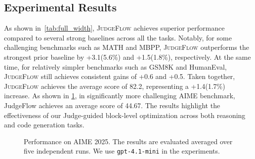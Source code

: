 \documentclass{article}
\theoremstyle{plain}
\theoremstyle{definition}
\theoremstyle{remark}
\def \our{\textsc{JudgeFlow}}
\begin{document}
\subsection{Experimental Results}

As shown in~\cref{tab:full_width}, \our{} achieves superior performance compared to several strong baselines across all the tasks. Notably, for some challenging benchmarks such as MATH and MBPP, \our{} outperforms the strongest prior baseline by +3.1(5.6\%) and +1.5(1.8\%), respectively. At the same time, for relatively simpler benchmarks such as GSM8K and HumanEval, \our{} still achieves consistent gains of +0.6 and +0.5. Taken together, \our{} achieves the average score of 82.2, representing a +1.4(1.7\%) increase. As shown in \cref{fig:aime2025}, in significantly more challenging AIME benchmark, JudgeFlow achieves an average score of {44.67}. The results highlight the effectiveness of our Judge-guided block-level optimization across both reasoning and code generation tasks. 


\begin{figure}
\centering
{}
\caption{Performance on AIME 2025. The results are evaluated averaged over five independent runs. We use \texttt{gpt-4.1-mini} in the experiments.}
    \label{fig:aime2025}
\end{figure}
\end{document}
